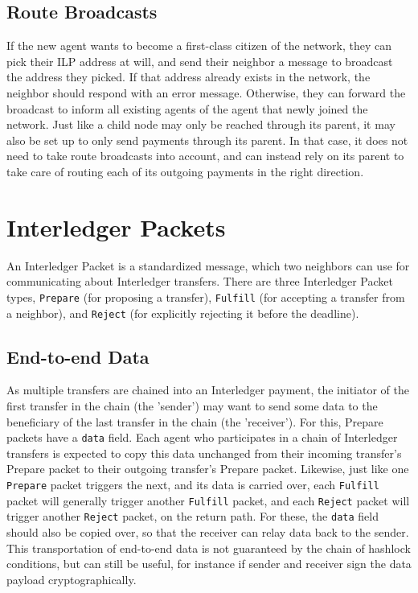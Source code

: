 \documentclass[11pt,twoside,a4paper]{article}
\begin{document}
\subsection{Route Broadcasts}
If the new agent wants to become a first-class citizen of the network, they can pick their ILP address at will, and send their neighbor a message to broadcast the address they picked.
If that address already exists in the network, the neighbor should respond with an error message. Otherwise, they can forward the broadcast to inform all existing agents of the agent
that newly joined the network. Just like a child node may only be reached through its parent, it may also be set up to only send payments through its parent. In that case, it does not need
to take route broadcasts into account, and can instead rely on its parent to take care of routing each of its outgoing payments in the right direction.

\section{Interledger Packets}
An Interledger Packet is a standardized message, which two neighbors can use for communicating about Interledger transfers. There are three Interledger Packet
types, {\tt Prepare} (for proposing a transfer), {\tt Fulfill} (for accepting a transfer from a neighbor), and {\tt Reject} (for explicitly rejecting it before the deadline).

\subsection{End-to-end Data}
As multiple transfers are chained into an Interledger payment, the initiator of the first transfer in the chain (the 'sender') may want to send some data to the
beneficiary of the last transfer in the chain (the 'receiver'). For this, Prepare packets have a {\tt data} field. Each agent who participates in a chain of Interledger
transfers is expected to copy this data unchanged from their incoming transfer's Prepare packet to their outgoing transfer's Prepare packet. Likewise,
just like one {\tt Prepare} packet triggers the next, and its data is carried over, each {\tt Fulfill} packet will generally trigger another {\tt Fulfill} packet, and each {\tt Reject}
packet will trigger another {\tt Reject} packet, on the return path. For these, the {\tt data} field should also be copied over, so that the receiver can relay data back
to the sender. This transportation of end-to-end data is not guaranteed by the chain of hashlock conditions, but can still be useful, for instance if sender and receiver sign
the data payload cryptographically.
\end{document}

